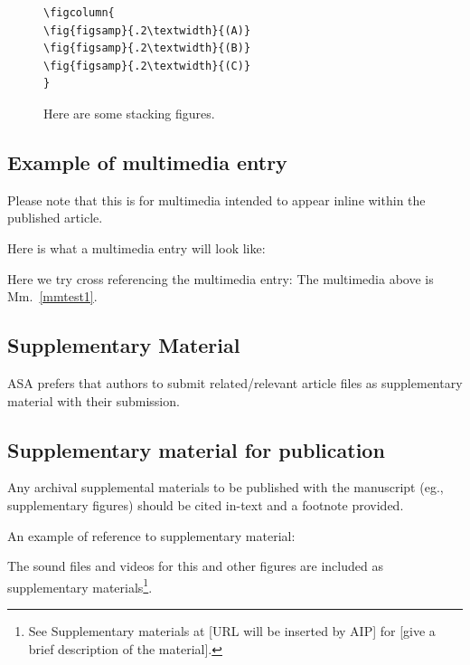 \documentclass{JASA-EL}
\begin{document}
\begin{figure}[h]
\baselineskip=12pt
\begin{verbatim}
\figcolumn{
\fig{figsamp}{.2\textwidth}{(A)}
\fig{figsamp}{.2\textwidth}{(B)}
\fig{figsamp}{.2\textwidth}{(C)}
}
\end{verbatim}


\caption{Here are some stacking figures.}
\end{figure}

\subsection{Example of multimedia entry}
Please note that this is for multimedia intended to appear inline
within the published article. 

Here is what a multimedia entry will look like:
\label{mmtest1}

Here we try cross referencing the multimedia entry: The multimedia
above is Mm.~\ref{mmtest1}.

\subsection{Supplementary Material}
ASA
prefers that authors to submit related/relevant article files as
supplementary material with their submission.

\subsection{Supplementary material for publication}
Any archival supplemental materials to be published with the
manuscript (eg., supplementary figures) should be cited in-text and a footnote provided.

An example of reference to supplementary material:

The sound files and videos for this and other figures
are included as supplementary materials\footnote{See
Supplementary materials at [URL will be inserted by AIP]
for [give a brief description of the material].}.
\end{document}
